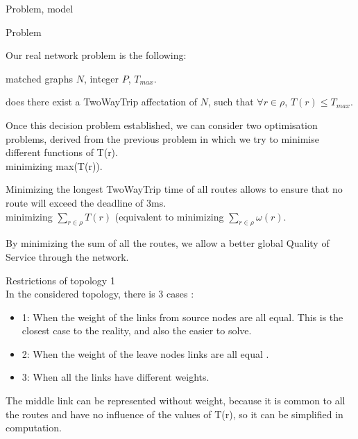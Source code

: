 \documentclass[a4paper,10pt]{report}
\begin{document}
\begin{chapter}{Problem, model}
\begin{section}{Problem}


Our real network problem is the following:\\


 matched graphs $N$, integer $P$, $ T_{max}$.

 does there exist a TwoWayTrip affectation of $N$, such that $\forall r \in \rho$, $T(r) \le T_{max}$.

Once this decision problem established, we can consider two optimisation problems, derived from the previous problem in which
we try to minimise different functions of T(r).\\

 minimizing max(T(r)).

Minimizing the longest TwoWayTrip time of all routes allows to ensure that no route will exceed the deadline of 3ms.\\

 minimizing $\sum_{r \in \rho}  T(r)$ (equivalent to minimizing $\sum_{r \in \rho}  \omega(r)$.

By minimizing the sum of all the routes, we allow a better global Quality of Service through the network.\\
\begin{subsection}{Restrictions of topology 1}
\\


In the considered topology, there is 3 cases :
\begin{itemize}
 \item 1: When the weight of the links from source nodes are all equal. This is the closest case to the reality, and also the easier to solve.
 \item 2: When the weight of the leave nodes links are all equal .
 \item 3: When all the links have different weights.
\end{itemize}
The middle link can be represented without weight, because it is common to all the routes and have no influence of the values of T(r), so it can be simplified in computation. 


\end{subsection}
\end{section}
\end{chapter}
\end{document}
